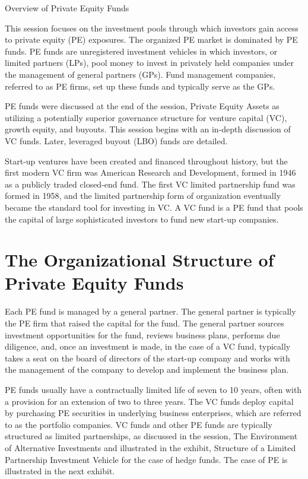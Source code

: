 \documentclass[11pt]{article}
\begin{document}
Overview of Private Equity Funds

This session focuses on the investment pools through which investors gain access to private equity (PE) exposures. The organized PE market is dominated by PE funds. PE funds are unregistered investment vehicles in which investors, or limited partners (LPs), pool money to invest in privately held companies under the management of general partners (GPs). Fund management companies, referred to as PE firms, set up these funds and typically serve as the GPs.

PE funds were discussed at the end of the session, Private Equity Assets as utilizing a potentially superior governance structure for venture capital (VC), growth equity, and buyouts. This session begins with an in-depth discussion of VC funds. Later, leveraged buyout (LBO) funds are detailed.

Start-up ventures have been created and financed throughout history, but the first modern VC firm was American Research and Development, formed in 1946 as a publicly traded closed-end fund. The first VC limited partnership fund was formed in 1958, and the limited partnership form of organization eventually became the standard tool for investing in VC. A VC fund is a PE fund that pools the capital of large sophisticated investors to fund new start-up companies.

\section*{The Organizational Structure of Private Equity Funds}
Each PE fund is managed by a general partner. The general partner is typically the PE firm that raised the capital for the fund. The general partner sources investment opportunities for the fund, reviews business plans, performs due diligence, and, once an investment is made, in the case of a VC fund, typically takes a seat on the board of directors of the start-up company and works with the management of the company to develop and implement the business plan.

PE funds usually have a contractually limited life of seven to 10 years, often with a provision for an extension of two to three years. The VC funds deploy capital by purchasing PE securities in underlying business enterprises, which are referred to as the portfolio companies. VC funds and other PE funds are typically structured as limited partnerships, as discussed in the session, The Environment of Alternative Investments and illustrated in the exhibit, Structure of a Limited Partnership Investment Vehicle for the case of hedge funds. The case of PE is illustrated in the next exhibit.
\end{document}

